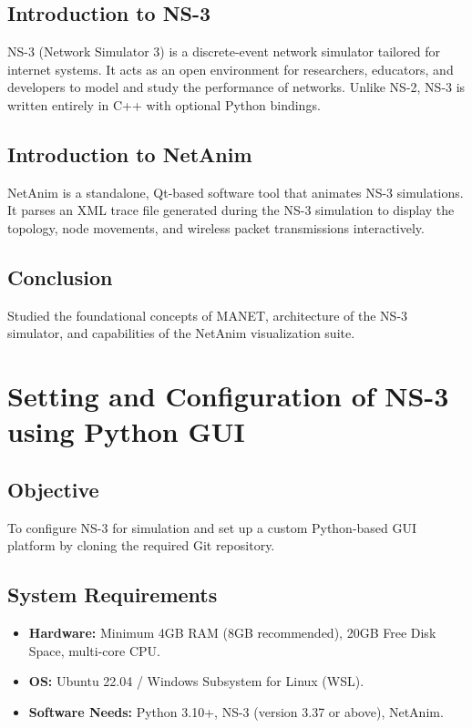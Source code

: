 \documentclass[12pt,a4paper]{report}
\begin{document}
\section{Introduction to NS-3}
NS-3 (Network Simulator 3) is a discrete-event network simulator tailored for internet systems. It acts as an open environment for researchers, educators, and developers to model and study the performance of networks.
Unlike NS-2, NS-3 is written entirely in C++ with optional Python bindings. 

\section{Introduction to NetAnim}
NetAnim is a standalone, Qt-based software tool that animates NS-3 simulations. It parses an XML trace file generated during the NS-3 simulation to display the topology, node movements, and wireless packet transmissions interactively.

\section{Conclusion}
Studied the foundational concepts of MANET, architecture of the NS-3 simulator, and capabilities of the NetAnim visualization suite.

\chapter{Setting and Configuration of NS-3 using Python GUI}

\section{Objective}
To configure NS-3 for simulation and set up a custom Python-based GUI platform by cloning the required Git repository.

\section{System Requirements}
\begin{itemize}
    \item \textbf{Hardware:} Minimum 4GB RAM (8GB recommended), 20GB Free Disk Space, multi-core CPU.
    \item \textbf{OS:} Ubuntu 22.04 / Windows Subsystem for Linux (WSL).
    \item \textbf{Software Needs:} Python 3.10+, NS-3 (version 3.37 or above), NetAnim.
\end{itemize}
\end{document}
